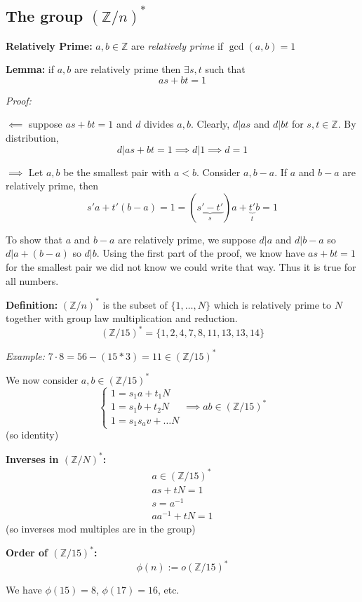 \documentclass[12pt]{report}
\newcommand{\Z}{\mathbb{Z}}
\begin{document}
\subsection*{The group $(\Z/n)^*$}
\textbf{Relatively Prime:} $a, b \in \Z$ are \emph{relatively prime} if $\gcd(a, b) = 1$

\textbf{Lemma:} if $a, b$ are relatively prime then $\exists s, t$ such that 
\[as + bt =1\]

\emph{Proof:}

$\impliedby$ suppose $as + bt = 1$ and $d$ divides $a, b$. Clearly, $d | as$ and $d | bt$ for $s, t\in \Z$. By distribution, 
\[d| as + bt = 1 \implies d | 1 \implies d = 1\]

$\implies$ Let $a, b$ be the smallest pair with $a < b$. Consider $a, b - a$. If $a$ and $b-a$ are relatively prime, then 
\[s'a + t'(b- a) = 1 = (\underbrace{s'- t'}_s) a + \underbrace{t'}_tb = 1\]

To show that $a$ and $b- a$ are relatively prime, we suppose $d | a$ and $d | b-a$ so $d | a + (b-a)$ so $d |b$. Using the first part of the proof, we know have $as + bt =1$ for the smallest pair we did not know we could write that way. Thus it is true for all numbers.

\textbf{Definition:} $(\Z/n)^*$ is the subset of $\{1, \dots, N\}$ which is relatively prime to $N$ together with group law multiplication and reduction.
\[(\Z/15)^* = \{1, 2, 4, 7, 8, 11, 13, 13, 14\}\]

\emph{Example:} $7\cdot 8 = 56 - (15*3) = 11 \in (\Z/15)^* $

We now consider $a, b \in (\Z/15)^*$ 
\[\begin{cases}
    1 = s_1 a + t_1 N\\
    1 = s_1 b + t_2 N\\
    1 = s_1 s_av + \dots N
\end{cases} \implies ab \in (\Z/15)^*\] 
(so identity)

\textbf{Inverses in $(\Z/N)^*$:}
\begin{align*}
    a \in (\Z/15)^*\\
    as + tN = 1\\
    s = a^{-1}\\
    aa^{-1} + tN = 1
\end{align*}
(so inverses mod multiples are in the group)

\textbf{Order of $(\Z/15)^*$:} 
\[\phi(n) := o(\Z/15)^*\]

We have $\phi(15) = 8$, $\phi(17) = 16$, etc.
\end{document}

